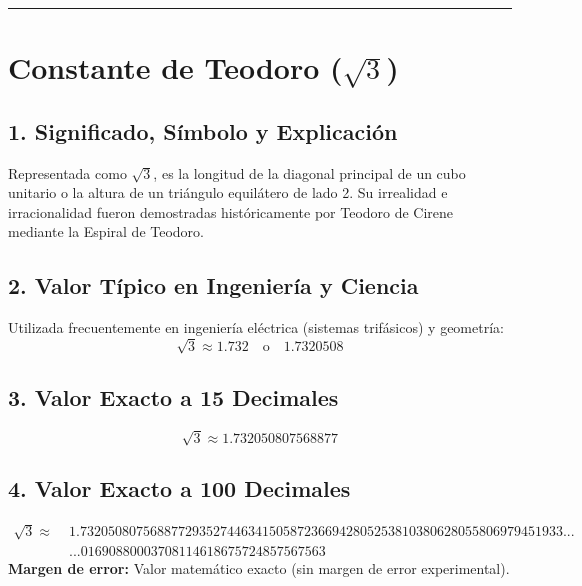 \documentclass[12pt,a4paper]{article}
\begin{document}
\vspace{0.8cm}
\hrule
\vspace{0.8cm}

\section{Constante de Teodoro ($\sqrt{3}$)}

\subsection*{1. Significado, Símbolo y Explicación}
Representada como $\sqrt{3}$, es la longitud de la diagonal principal de un cubo unitario o la altura de un triángulo equilátero de lado 2. Su irrealidad e irracionalidad fueron demostradas históricamente por Teodoro de Cirene mediante la Espiral de Teodoro.

\subsection*{2. Valor Típico en Ingeniería y Ciencia}
Utilizada frecuentemente en ingeniería eléctrica (sistemas trifásicos) y geometría:
\begin{equation*}
\sqrt{3} \approx 1.732 \quad \text{o} \quad 1.7320508
\end{equation*}

\subsection*{3. Valor Exacto a 15 Decimales}
\begin{equation*}
\sqrt{3} \approx 1.732050807568877
\end{equation*}

\subsection*{4. Valor Exacto a 100 Decimales}
\begin{align*}
\sqrt{3} \approx \; & 1.732050807568877293527446341505872366942805253810380628055806979451933... \\
& ...01690880003708114618675724857567563
\end{align*}
\textbf{Margen de error:} Valor matemático exacto (sin margen de error experimental).
\end{document}

